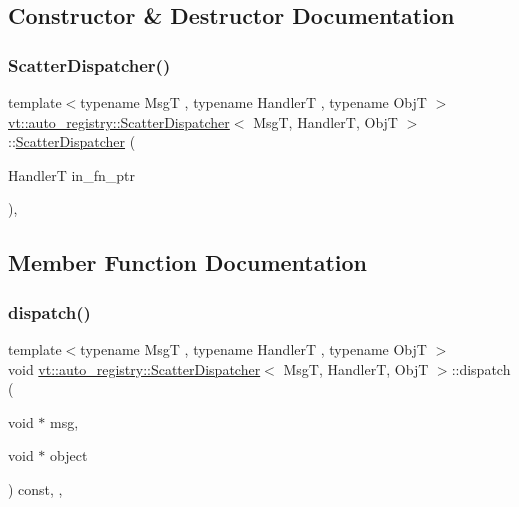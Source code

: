 \subsection{Constructor \& Destructor Documentation}
\mbox{\label{structvt_1_1auto__registry_1_1_scatter_dispatcher_a1059ed7e28fe51d138a6945593dce385}} 
\subsubsection{\texorpdfstring{Scatter\+Dispatcher()}{ScatterDispatcher()}}
{\footnotesize\ttfamily template$<$typename MsgT , typename HandlerT , typename ObjT $>$ \\
\hyperlink{structvt_1_1auto__registry_1_1_scatter_dispatcher}{vt\+::auto\+\_\+registry\+::\+Scatter\+Dispatcher}$<$ MsgT, HandlerT, ObjT $>$\+::\hyperlink{structvt_1_1auto__registry_1_1_scatter_dispatcher}{Scatter\+Dispatcher} (\begin{DoxyParamCaption}\item[{HandlerT}]{in\+\_\+fn\+\_\+ptr }\end{DoxyParamCaption})\hspace{0.3cm}{\ttfamily [inline]}, {\ttfamily [explicit]}}



\subsection{Member Function Documentation}
\mbox{\label{structvt_1_1auto__registry_1_1_scatter_dispatcher_af0bc28e159a179b15cd964c187d8c85b}} 
\subsubsection{\texorpdfstring{dispatch()}{dispatch()}}
{\footnotesize\ttfamily template$<$typename MsgT , typename HandlerT , typename ObjT $>$ \\
void \hyperlink{structvt_1_1auto__registry_1_1_scatter_dispatcher}{vt\+::auto\+\_\+registry\+::\+Scatter\+Dispatcher}$<$ MsgT, HandlerT, ObjT $>$\+::dispatch (\begin{DoxyParamCaption}\item[{void $\ast$}]{msg,  }\item[{void $\ast$}]{object }\end{DoxyParamCaption}) const\hspace{0.3cm}{\ttfamily [inline]}, {\ttfamily [override]}, {\ttfamily [virtual]}}



